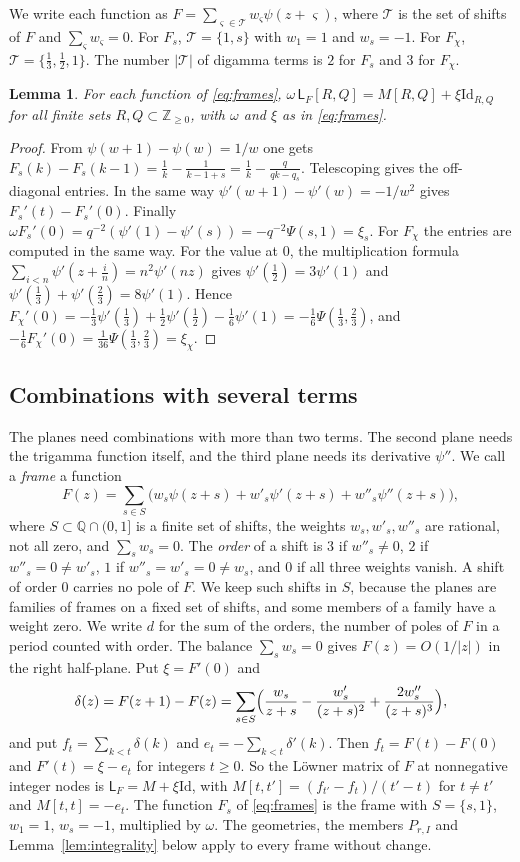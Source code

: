 \documentclass[11pt]{amsart}
\newtheorem{lemma}[theorem]{Lemma}
\theoremstyle{definition}
\theoremstyle{remark}
\numberwithin{equation}{section}
\newcommand{\Z}{\mathbb Z}
\newcommand{\Q}{\mathbb Q}
\newcommand{\Lw}{\mathsf L}          %
\newcommand{\Id}{\mathrm{Id}}
\begin{document}
We write each function as $F=\sum_{\varsigma\in\mathcal T}w_\varsigma\psi(z+\varsigma)$, where $\mathcal T$ is the set of
shifts of $F$ and $\sum_\varsigma w_\varsigma=0$. For $F_s$, $\mathcal T=\{1,s\}$ with $w_1=1$ and $w_s=-1$. For
$F_\chi$, $\mathcal T=\{\frac13,\frac12,1\}$. The number $|\mathcal T|$ of digamma terms is $2$ for $F_s$ and $3$ for
$F_\chi$.

\begin{lemma}\label{lem:loewner}
For each function of \eqref{eq:frames}, $\omega\,\Lw_F[R,Q]=M[R,Q]+\xi\Id_{R,Q}$ for all finite sets
$R,Q\subset\Z_{\ge0}$, with $\omega$ and $\xi$ as in \eqref{eq:frames}.
\end{lemma}
\begin{proof}
From $\psi(w+1)-\psi(w)=1/w$ one gets $F_s(k)-F_s(k-1)=\frac1k-\frac1{k-1+s}=\frac1k-\frac q{qk-q_s}$. Telescoping gives the
off-diagonal entries. In the same way $\psi'(w+1)-\psi'(w)=-1/w^2$ gives $F_s'(t)-F_s'(0)$. Finally
$\omega F_s'(0)=q^{-2}(\psi'(1)-\psi'(s))=-q^{-2}\Psi(s,1)=\xi_s$. For $F_\chi$ the entries are computed in the same way.
For the value at $0$, the multiplication formula $\sum_{i<n}\psi'(z+\frac in)=n^2\psi'(nz)$ gives
$\psi'(\frac12)=3\psi'(1)$ and $\psi'(\frac13)+\psi'(\frac23)=8\psi'(1)$. Hence
$F_\chi'(0)=-\frac13\psi'(\frac13)+\frac12\psi'(\frac12)-\frac16\psi'(1)=-\frac16\Psi(\frac13,\frac23)$, and
$-\frac16F_\chi'(0)=\frac1{36}\Psi(\frac13,\frac23)=\xi_\chi$.
\end{proof}

\subsection{Combinations with several terms}\label{ssec:frames}
The planes need combinations with more than two terms. The second plane needs the trigamma function itself, and the
third plane needs its derivative $\psi''$. We call a \emph{frame} a function
\[
 F(z)=\sum_{s\in S}\bigl(w_s\psi(z+s)+w'_s\psi'(z+s)+w''_s\psi''(z+s)\bigr),
\]
where $S\subset\Q\cap(0,1]$ is a finite set of shifts, the weights $w_s,w'_s,w''_s$ are rational, not all zero, and
$\sum_sw_s=0$. The \emph{order} of a shift is $3$ if $w''_s\ne0$, $2$ if $w''_s=0\ne w'_s$, $1$ if
$w''_s=w'_s=0\ne w_s$, and $0$ if all three weights vanish. A shift of order $0$ carries no pole of $F$. We keep such shifts in $S$, because the planes are
families of frames on a fixed set of shifts, and some members of a family have a weight zero. We write $d$ for the sum
of the orders, the number of poles of $F$ in a period counted with order. The balance $\sum_sw_s=0$ gives
$F(z)=O(1/|z|)$ in the right half-plane. Put $\xi=F'(0)$ and
\[
 \delta(z)=F(z+1)-F(z)=\sum_{s\in S}\Bigl(\frac{w_s}{z+s}-\frac{w'_s}{(z+s)^2}+\frac{2w''_s}{(z+s)^3}\Bigr),
\]
and put $f_t=\sum_{k<t}\delta(k)$ and $e_t=-\sum_{k<t}\delta'(k)$.
Then $f_t=F(t)-F(0)$ and $F'(t)=\xi-e_t$ for integers $t\ge0$. So the L\"owner matrix of $F$ at nonnegative integer
nodes is $\Lw_F=M+\xi\Id$, with $M[t,t']=(f_{t'}-f_t)/(t'-t)$ for $t\ne t'$ and $M[t,t]=-e_t$. The function $F_s$ of
\eqref{eq:frames} is the frame with $S=\{s,1\}$, $w_1=1$, $w_s=-1$, multiplied by $\omega$. The geometries, the members
$P_{r,I}$ and Lemma~\ref{lem:integrality} below apply to every frame without change.
\end{document}
